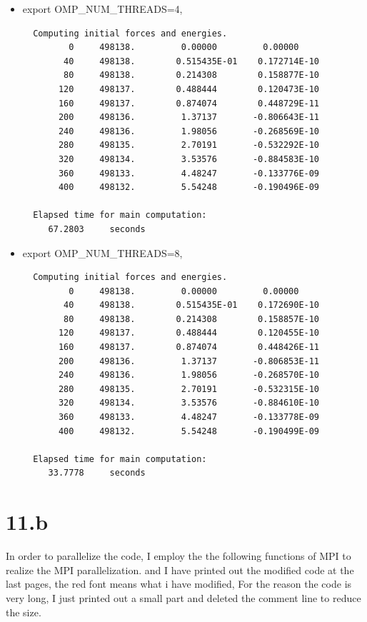 \documentclass{article}
\begin{document}
\begin{center}
\begin{itemize}
     \item export OMP\_NUM\_THREADS=4,
 {\tiny{ \begin{verbatim}
  Computing initial forces and energies.
         0     498138.         0.00000         0.00000
        40     498138.        0.515435E-01    0.172714E-10
        80     498138.        0.214308        0.158877E-10
       120     498137.        0.488444        0.120473E-10
       160     498137.        0.874074        0.448729E-11
       200     498136.         1.37137       -0.806643E-11
       240     498136.         1.98056       -0.268569E-10
       280     498135.         2.70191       -0.532292E-10
       320     498134.         3.53576       -0.884583E-10
       360     498133.         4.48247       -0.133776E-09
       400     498132.         5.54248       -0.190496E-09

  Elapsed time for main computation:
     67.2803     seconds
   \end{verbatim}}}

        \item export OMP\_NUM\_THREADS=8,
 {\tiny{ \begin{verbatim}
  Computing initial forces and energies.
         0     498138.         0.00000         0.00000
        40     498138.        0.515435E-01    0.172690E-10
        80     498138.        0.214308        0.158857E-10
       120     498137.        0.488444        0.120455E-10
       160     498137.        0.874074        0.448426E-11
       200     498136.         1.37137       -0.806853E-11
       240     498136.         1.98056       -0.268570E-10
       280     498135.         2.70191       -0.532315E-10
       320     498134.         3.53576       -0.884610E-10
       360     498133.         4.48247       -0.133778E-09
       400     498132.         5.54248       -0.190499E-09

  Elapsed time for main computation:
     33.7778     seconds
   \end{verbatim}}}
\end{itemize}

\end{center}


\section*{11.b}
In order to parallelize the code, I employ the the following functions of MPI to realize the MPI parallelization.
and I have printed out the modified code at the last pages, the red font means what i have modified, For the reason the code is very long,
I just printed out a small part and deleted the comment line to reduce the size.
\end{document}
